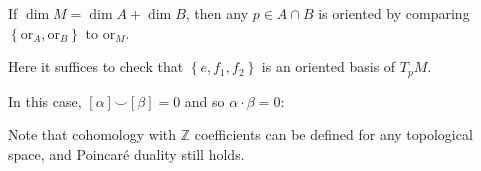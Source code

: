 \begin{example}[?]

If \(\dim M = \dim A + \dim B\), then any \(p\in A \cap B\) is oriented
by comparing \(\left\{{ \mathrm{or}_A, \mathrm{or}_B}\right\}\) to
\(\mathrm{or}_M\).

\begin{figure}
\centering
{}
\end{figure}

Here it suffices to check that \(\left\{{ e, f_1, f_2 }\right\}\) is an
oriented basis of \(T_p M\).

\end{example}

\begin{example}[?]

In this case, \([\alpha] \smile[\beta] = 0\) and so
\(\alpha\cdot \beta = 0\):

\begin{figure}
\centering
{}
\end{figure}

\end{example}

\begin{remark}

Note that cohomology with \({\mathbb{Z}}\) coefficients can be defined
for any topological space, and Poincaré duality still holds.

\end{remark}

